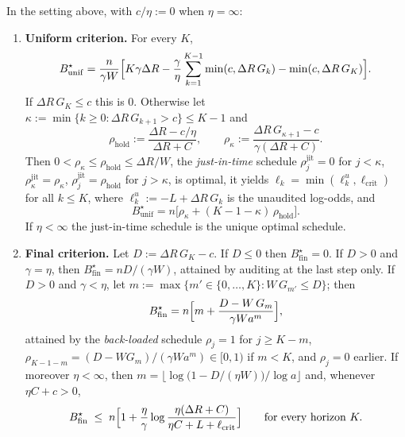 \begin{theorem}
\label{thm:audit-deterrence}
In the setting above, with $c/\eta:=0$ when $\eta=\infty$:
\begin{enumerate}
\item[\textup{(i)}] \textbf{Uniform criterion.} For every $K$,
\begin{equation}\label{eq:audit-unif-id}
  B^\star_{\mathrm{unif}}=\frac{n}{\gamma W}\Bigl[K\gamma\Delta R
   -\frac{\gamma}{\eta}\sum_{k=1}^{K-1}\min(c,\Delta R\,G_k)-\min(c,\Delta R\,G_K)\Bigr].
\end{equation}
If $\Delta R\,G_K\le c$ this is $0$. Otherwise let
$\kappa:=\min\{k\ge0:\Delta R\,G_{k+1}>c\}\le K-1$ and
\[
  \rho_{\mathrm{hold}}:=\frac{\Delta R-c/\eta}{\Delta R+C},\qquad
  \rho_\kappa:=\frac{\Delta R\,G_{\kappa+1}-c}{\gamma(\Delta R+C)} .
\]
Then $0<\rho_\kappa\le\rho_{\mathrm{hold}}\le\Delta R/W$, the
\emph{just-in-time} schedule
$\rho^{\mathrm{jit}}_j=0$ for $j<\kappa$, $\rho^{\mathrm{jit}}_\kappa=\rho_\kappa$,
$\rho^{\mathrm{jit}}_j=\rho_{\mathrm{hold}}$ for $j>\kappa$, is optimal, it yields
$\ell_k=\min(\ell^{u}_k,\ell_{\mathrm{crit}})$ for all $k\le K$, where $\ell^{u}_k:=-L+\Delta R\,G_k$ is the unaudited log-odds, and
\begin{equation}\label{eq:audit-unif}
  B^\star_{\mathrm{unif}}=n\bigl[\rho_\kappa+(K-1-\kappa)\,\rho_{\mathrm{hold}}\bigr].
\end{equation}
If $\eta<\infty$ the just-in-time schedule is the unique optimal schedule.
\item[\textup{(ii)}] \textbf{Final criterion.} Let $D:=\Delta R\,G_K-c$. If
$D\le0$ then $B^\star_{\mathrm{fin}}=0$. If $D>0$ and $\gamma=\eta$, then
$B^\star_{\mathrm{fin}}=nD/(\gamma W)$, attained by auditing at the last step
only. If $D>0$ and $\gamma<\eta$, let
$m:=\max\{m'\in\{0,\dots,K\}: W\,G_{m'}\le D\}$; then
\begin{equation}\label{eq:audit-fin}
  B^\star_{\mathrm{fin}}=n\Bigl[m+\frac{D-W\,G_m}{\gamma W a^{m}}\Bigr],
\end{equation}
attained by the \emph{back-loaded} schedule $\rho_j=1$ for $j\ge K-m$,
$\rho_{K-1-m}=(D-WG_m)/(\gamma Wa^m)\in[0,1)$ if $m<K$, and $\rho_j=0$ earlier.
If moreover $\eta<\infty$, then
$m=\bigl\lfloor \log\bigl(1-D/(\eta W)\bigr)/\log a\bigr\rfloor$ and, whenever
$\eta C+c>0$,
\begin{equation}\label{eq:audit-fin-bound}
  B^\star_{\mathrm{fin}}\;\le\; n\Bigl[1+\frac{\eta}{\gamma}
  \log\frac{\eta(\Delta R+C)}{\eta C+L+\ell_{\mathrm{crit}}}\Bigr]
  \qquad\text{for every horizon }K .
\end{equation}
\end{enumerate}
\end{theorem}

